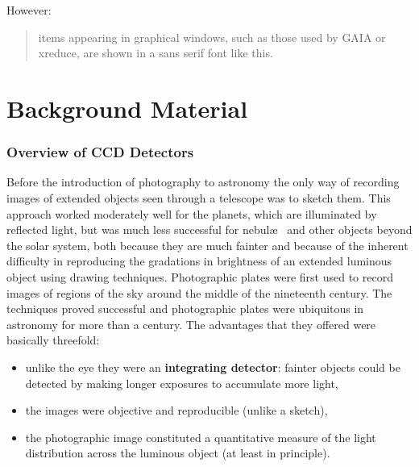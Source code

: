 \documentclass[twoside,11pt]{starlink}
\begin{document}
However:

\begin{quote}
\textsf{items appearing in graphical windows, such as those used by GAIA
or xreduce, are shown in a sans serif font like this.}
\end{quote}


\cleardoublepage

\part{Background Material}

\section{\label{WHAT}Overview of CCD Detectors}

Before the introduction of photography to astronomy the only way of
recording images of extended objects seen through a telescope was to
sketch them.  This approach worked moderately well for the planets, which
are illuminated by reflected light, but was much less successful for
nebul\ae~ and other objects beyond the solar system, both because they
are much fainter and because of the inherent difficulty in reproducing
the gradations in brightness of an extended luminous object using
drawing techniques.  Photographic plates were first used to record images
of regions of the sky around the middle of the nineteenth century.  The
techniques proved successful and photographic plates were ubiquitous in
astronomy for more than a century.  The advantages that they offered
were basically threefold:

\begin{itemize}

  \item unlike the eye they were an \textbf{integrating detector}: fainter
   objects could be detected by making longer exposures to accumulate
   more light,

  \item the images were objective and reproducible (unlike a sketch),

  \item the photographic image constituted a quantitative measure of the
   light distribution across the luminous object (at least in principle).

\end{itemize}
\end{document}
